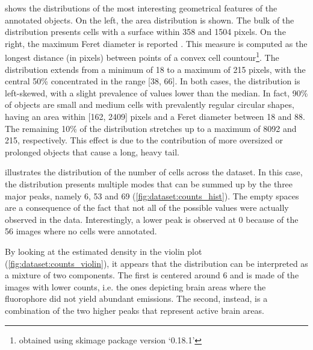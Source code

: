  shows the distributions of the most interesting geometrical features of the annotated objects.
On the left, the area distribution is shown. 
The bulk of the distribution presents cells with a surface within 358 and 1504 pixels.
On the right, the maximum Feret diameter is reported \cite{merkus2009particle}. This measure is computed as the longest distance (in pixels) between points of a convex cell countour\footnote{obtained using skimage package version `0.18.1'}.
The distribution extends from a minimum of 18 to a maximum of 215 pixels, with the central 50\% concentrated in the range [38, 66].
In both cases, the distribution is left-skewed, with a slight prevalence of values lower than the median.
In fact, 90\% of objects are small and medium cells with prevalently regular circular shapes, having an area within [162, 2409] pixels and a Feret diameter between 18 and 88.
The remaining 10\% of the distribution stretches up to a maximum of 8092 and 215, respectively.
This effect is due to the contribution of more oversized or prolonged objects that cause a long, heavy tail.

 illustrates the distribution of the number of cells across the dataset.
In this case, the distribution presents multiple modes that can be summed up by the three major peaks, namely 6, 53 and 69
(\cref{fig:dataset:counts_hist}).
The empty spaces are a consequence of the fact that not all of the possible values were actually observed in the data.
Interestingly, a lower peak is observed at 0 because of the 56 images where no cells were annotated.

By looking at the estimated density in the violin plot (\cref{fig:dataset:counts_violin}), it appears that the distribution can be interpreted as a mixture of two components.
The first is centered around 6 and is made of the images with lower counts, i.e. the ones depicting brain areas where the fluorophore did not yield abundant emissions.
The second, instead, is a combination of the two higher peaks that represent active brain areas.


